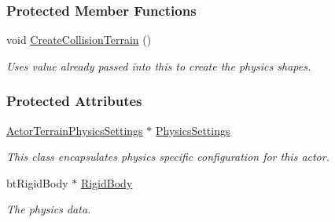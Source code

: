 \subsubsection*{Protected Member Functions}
\begin{DoxyCompactItemize}
\item 
\hypertarget{classMezzanine_1_1ActorTerrain_a8abb8266335f414347a23c949bd53dfc}{
void \hyperlink{classMezzanine_1_1ActorTerrain_a8abb8266335f414347a23c949bd53dfc}{CreateCollisionTerrain} ()}
\label{classMezzanine_1_1ActorTerrain_a8abb8266335f414347a23c949bd53dfc}

\begin{DoxyCompactList}\small\item\em Uses value already passed into this to create the physics shapes. \item\end{DoxyCompactList}\end{DoxyCompactItemize}
\subsubsection*{Protected Attributes}
\begin{DoxyCompactItemize}
\item 
\hypertarget{classMezzanine_1_1ActorTerrain_a2b116504be8548c2574e7b1ddef7467d}{
\hyperlink{classMezzanine_1_1ActorTerrainPhysicsSettings}{ActorTerrainPhysicsSettings} $\ast$ \hyperlink{classMezzanine_1_1ActorTerrain_a2b116504be8548c2574e7b1ddef7467d}{PhysicsSettings}}
\label{classMezzanine_1_1ActorTerrain_a2b116504be8548c2574e7b1ddef7467d}

\begin{DoxyCompactList}\small\item\em This class encapsulates physics specific configuration for this actor. \item\end{DoxyCompactList}\item 
\hypertarget{classMezzanine_1_1ActorTerrain_a631d262f2f676474c19334d00d33eb12}{
btRigidBody $\ast$ \hyperlink{classMezzanine_1_1ActorTerrain_a631d262f2f676474c19334d00d33eb12}{RigidBody}}
\label{classMezzanine_1_1ActorTerrain_a631d262f2f676474c19334d00d33eb12}

\begin{DoxyCompactList}\small\item\em The physics data. \item\end{DoxyCompactList}\end{DoxyCompactItemize}


